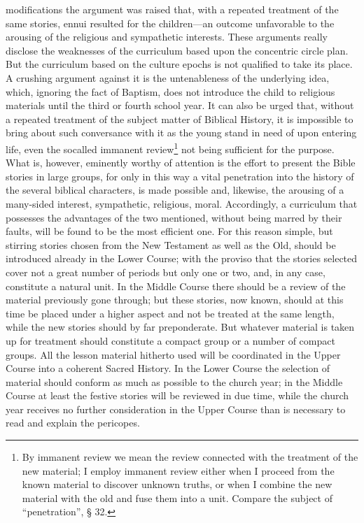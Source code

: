 modifications the argument was raised that, with a repeated treatment of the same stories, ennui resulted for the children—an outcome unfavorable to the arousing of the religious and sympathetic interests. These arguments really disclose the weaknesses of the curriculum based upon the concentric circle plan. But the curriculum based on the culture epochs is not qualified to take its place. A crushing argument against it is the untenableness of the underlying idea, which, ignoring the fact of Baptism, does not introduce the child to religious materials until the third or fourth school year. It can also be urged that, without a repeated treatment of the subject matter of Biblical History, it is impossible to bring about such conversance with it as the young stand in need of upon entering life, even the socalled immanent review\footnote{By immanent review we mean the review connected with the treatment of the new material; I employ immanent review either when I proceed from the known material to discover unknown truths, or when I combine the new material with the old and fuse them into a unit. Compare the subject of “penetration”, § 32.} not being sufficient for the purpose. What is, however, eminently worthy of attention is the effort to present the Bible stories in large groups, for only in this way a vital penetration into the history of the several biblical characters, is made possible and, likewise, the arousing of a many-sided interest, sympathetic, religious, moral. Accordingly, a curriculum that possesses the advantages of the two mentioned, without being marred by their faults, will be found to be the most efficient one. For this reason simple, but stirring stories chosen from the New Testament as well as the Old, should be introduced already in the Lower Course; with the proviso that the stories selected cover not a great number of periods but only one or two, and, in any case, constitute a natural unit. In the Middle Course there should be a review of the material previously gone through; but these stories, now known, should at this time be placed under a higher aspect and not be
treated at the same length, while the new stories should by far preponderate. But whatever material is taken up for treatment should constitute a compact group or a number of compact groups. All the lesson material hitherto used will be coordinated in the Upper Course into a coherent Sacred History. In the Lower Course the selection of material should conform as much as possible to the church year; in the Middle Course at least the festive stories will be reviewed in due time, while the church year receives no further consideration in the Upper Course than is necessary to read and explain the pericopes.

